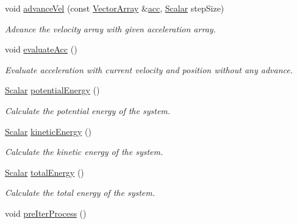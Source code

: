 \begin{DoxyCompactItemize}
void \mbox{\hyperlink{class_space_h_1_1_particle_system_a1c5413658f4946e9b2246bdd09107f84}{advance\+Vel}} (const \mbox{\hyperlink{class_space_h_1_1_particle_system_acf48c66c8d42b85cd3a77911bb7da9ce}{Vector\+Array}} \&\mbox{\hyperlink{class_space_h_1_1_particle_system_a9c7f70968a15d3d02248b313b086b21d}{acc}}, \mbox{\hyperlink{class_space_h_1_1_particle_system_a522770dcfaf8b29aed35ea9348185a34}{Scalar}} step\+Size)
\begin{DoxyCompactList}\small\item\em Advance the velocity array with given acceleration array. \end{DoxyCompactList}\item 
void \mbox{\hyperlink{class_space_h_1_1_particle_system_adf4cf89418a06d338dd464b775aa3446}{evaluate\+Acc}} ()
\begin{DoxyCompactList}\small\item\em Evaluate acceleration with current velocity and position without any advance. \end{DoxyCompactList}\item 
\mbox{\hyperlink{class_space_h_1_1_particle_system_a522770dcfaf8b29aed35ea9348185a34}{Scalar}} \mbox{\hyperlink{class_space_h_1_1_particle_system_a3b8fcc8922c6c32d888e0493d5058ae4}{potential\+Energy}} ()
\begin{DoxyCompactList}\small\item\em Calculate the potential energy of the system. \end{DoxyCompactList}\item 
\mbox{\hyperlink{class_space_h_1_1_particle_system_a522770dcfaf8b29aed35ea9348185a34}{Scalar}} \mbox{\hyperlink{class_space_h_1_1_particle_system_acf2ffbad4476dae3f259a60338d80288}{kinetic\+Energy}} ()
\begin{DoxyCompactList}\small\item\em Calculate the kinetic energy of the system. \end{DoxyCompactList}\item 
\mbox{\hyperlink{class_space_h_1_1_particle_system_a522770dcfaf8b29aed35ea9348185a34}{Scalar}} \mbox{\hyperlink{class_space_h_1_1_particle_system_a9351bf7ed263b6624456e610fd351190}{total\+Energy}} ()
\begin{DoxyCompactList}\small\item\em Calculate the total energy of the system. \end{DoxyCompactList}\item 
void \mbox{\hyperlink{class_space_h_1_1_particle_system_a7d20b605ada4cf4b19f5e7e4842a2200}{pre\+Iter\+Process}} ()

\end{DoxyCompactItemize}
